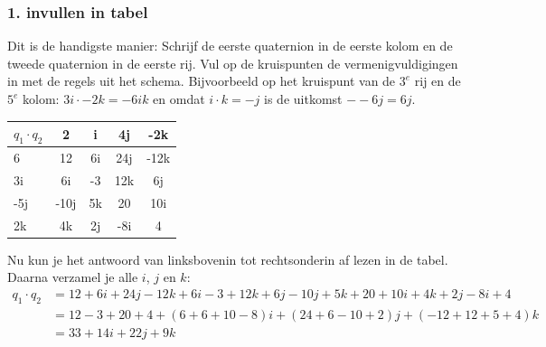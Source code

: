 \subsubsection{1. invullen in tabel} Dit is de handigste manier:  Schrijf de eerste quaternion in de eerste kolom en de tweede quaternion in de eerste rij. Vul op de kruispunten de 
vermenigvuldigingen in met de  regels uit het schema. Bijvoorbeeld op het kruispunt van de $ 3^e $ rij en de $   5^e $ kolom: $  3i\cdot -2k = -6ik   $ en omdat $ i\cdot k = -j $ is de uitkomst $ --6j = 6j $. 
\begin{center}
	\begin{NiceTabular}{ | a | c | c | c | c |}
		\hline
         \RowStyle{\color{white}} %
		$ q_1\cdot q_2 $& 2 & i & 4j & -2k \\  & 12 & 6i & 24j & -12k  \\ \hline
		3i & 6i & -3 & 12k & 6j\\ \hline
		-5j & -10j &  5k & 20 & 10i\\ \hline
		2k & 4k & 2j & -8i & 4\\ 
		\hline 
	\end{NiceTabular}
\end{center}
Nu kun je het antwoord van linksbovenin tot rechtsonderin af lezen in de tabel. Daarna verzamel je alle $i$, $j$ en $k$:
\begin{align*}
    q_1\cdot q_2 &= 12 + 6i + 24j - 12k + 6i - 3 + 12k + 6j - 10j + 5k + 20 + 10i + 4k + 2j - 8i + 4 \\
                 & = 12 - 3 + 20 + 4 + (6 + 6 + 10 - 8)i +(24 + 6 - 10 + 2)j +(-12 + 12 + 5 + 4)k \\
                 & = 33 + 14i + 22j + 9k
\end{align*}

\newpage
